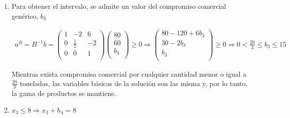 \begin{enumerate}
\item Para obtener el intervalo, se admite un valor del compromiso comercial genérico, $b_3$

\begin{equation}
\begin{split}
u^B = B^{-1}b = 
\begin{pmatrix}
1 & -2 & 6\\
0 & \frac{1}{2} & -2\\
0 & 0 & 1\\
\end{pmatrix}
\begin{pmatrix}
80\\
60\\
b_3\\
\end{pmatrix}
\geq 0 \Rightarrow
\begin{pmatrix}
80 - 120 + 6b_3\\
30-2b_3\\
b_3\\
\end{pmatrix}
\geq 0 \Rightarrow
0 < \frac{20}{3} \leq b_3 \leq 15 
\end{split}
\end{equation}

Mientras exista compromiso comercial por cualquier cantidad  menor o igual a $\frac{20}{3}$ toneladas, las variables básicas de la solución son las misma y, por lo tanto, la gama de productos se mantiene.

\item $x_3 \leq 8 \Rightarrow x_3 + h_4 = 8$




\end{enumerate}
